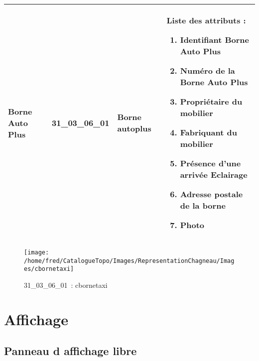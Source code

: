 \documentclass[12pt,titlepage]{book}
\begin{document}
\renewcommand{\arraystretch}{1.2}
\begin{supertabular}{|p{10cm}|c|p{13cm}|p{12cm}|}
 Borne Auto Plus & 31\_03\_06\_01 & Borne autoplus & Liste des attributs :
\begin{enumerate}
  \item Identifiant Borne Auto Plus  \item Numéro de la Borne Auto Plus  \item Propriétaire du mobilier  \item Fabriquant du mobilier  \item Présence d'une arrivée Eclairage  \item Adresse postale de la borne  \item Photo\end{enumerate}
\\
\hline
\end{supertabular}
\begin{figure}[h!]
  \hfill         %
  \begin{minipage}[t]{3cm}
    \begin{center}
      \texttt{[image: /home/fred/CatalogueTopo/Images/RepresentationChagneau/Images/cbornetaxi]}
      \caption[~31\_03\_06\_01]{\small{31\_03\_06\_01~:} \tiny{cbornetaxi}}\label{cbornetaxi}
    \end{center}
  \end{minipage}
\end{figure}

\section{\large Affichage}
\subsection{Panneau d affichage libre}
\noindent
\vspace{\baselineskip}
\end{document}
